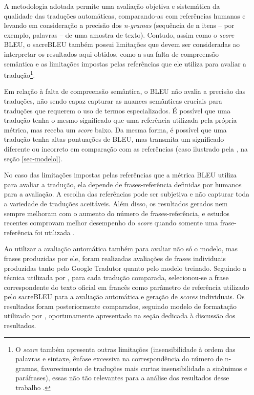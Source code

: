 \documentclass[portuguese]{textolivre}
\begin{document}
A metodologia adotada permite uma avaliação objetiva e sistemática da qualidade das traduções automáticas, comparando-as com referências humanas e levando em consideração a precisão dos \textit{n-gramas} (sequência de n itens – por exemplo, palavras – de uma amostra de texto). Contudo, assim como o \textit{score} BLEU, o sacreBLEU também possui limitações que devem ser consideradas ao interpretar os resultados aqui obtidos, como a sua falta de compreensão semântica e as limitações impostas pelas referências que ele utiliza para avaliar a tradução\footnote{O \textit{score} também apresenta outras limitações (insensibilidade à ordem das palavras e sintaxe, ênfase excessiva na correspondência do número de n-gramas, favorecimento de traduções mais curtas insensibilidade a sinônimos e paráfrases), essas não tão relevantes para a análise dos resultados desse trabalho \cite{post_call_2018}.}.

Em relação à falta de compreensão semântica, o BLEU não avalia a precisão das traduções, não sendo capaz capturar as nuances semânticas cruciais para traduções que requerem o uso de termos especializados. É possível que uma tradução tenha o mesmo significado que uma referência utilizada pela própria métrica, mas receba um \textit{score} baixo. Da mesma forma, é possível que uma tradução tenha altas pontuações de BLEU, mas transmita um significado diferente ou incorreto em comparação com as referências (caso ilustrado pela , na seção \ref{sec-modelo}).

No caso das limitações impostas pelas referências que a métrica BLEU utiliza para avaliar a tradução, ela depende de frases-referência definidas por humanos para a avaliação. A escolha das referências pode ser subjetiva e não capturar toda a variedade de traduções aceitáveis. Além disso, os resultados gerados nem sempre melhoram com o aumento do número de frases-referência, e estudos recentes comprovam melhor desempenho do \textit{score} quando somente uma frase-referência foi utilizada \cite{freitag_bleu_2020}. 

Ao utilizar a avaliação automática também para avaliar não só o modelo, mas frases produzidas por ele, foram realizadas avaliações de frases individuais produzidas tanto pelo Google Tradutor quanto pelo modelo treinado. Seguindo a técnica utilizada por \textcite{freitag_bleu_2020}, para cada tradução comparada, selecionou-se a frase correspondente do texto oficial em francês como parâmetro de referência utilizado pelo sacreBLEU para a avaliação automática e geração de \textit{scores} individuais. Os resultados foram posteriormente comparados, seguindo modelo de formatação utilizado por \textcite{banitz_machine_2020}, oportunamente apresentado na seção dedicada à discussão dos resultados.
\end{document}
